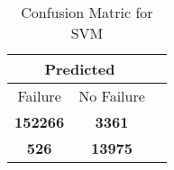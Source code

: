 \begin{table}[] 
\caption{Confusion Matric for SVM} 
\label{Table: Prediction Accuracy-NoneSVMSVMEKF-ignoreReflection-Reflection} 
\centering 
\begin{tabular} 
 {@{}ccc@{}} 
\toprule 
\multicolumn{2}{c}{\textbf{Predicted}}
 \\ \midrule 
\multicolumn{1}{|c|}{Failure} & 
\multicolumn{1}{c|}{No Failure}
 \\ \midrule 
\multicolumn{1}{|c|}{\color{green}\textbf{152266}} & 
\multicolumn{1}{c|}{\color{red}\textbf{3361}}
 \\ \midrule 
\multicolumn{1}{|c|}{\color{red}\textbf{526}} & 
\multicolumn{1}{c|}{\color{green}\textbf{13975}}
 \\ \bottomrule 
\end{tabular} 
\end{table} 
